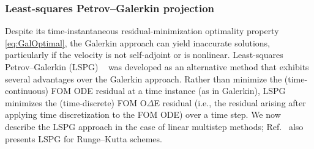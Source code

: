 \documentclass[3p,computermodern,10pt]{elsarticle}
\begin{document}
\subsubsection{Least-squares Petrov--Galerkin projection}
Despite its time-instantaneous residual-minimization optimality property 
\eqref{eq:GalOptimal}, the Galerkin approach can yield inaccurate solutions,
particularly if the velocity is not self-adjoint or
is nonlinear. 
Least-squares Petrov--Galerkin (LSPG)
~\cite{carlberg_lspg_v_galerkin,carlberg_thesis,carlberg_gnat,bui_unsteady,bui_thesis}
was developed
as an alternative method that exhibits several advantages over the Galerkin approach.
Rather than minimize the (time-continuous) FOM ODE residual at a time instance (as in Galerkin), LSPG minimizes
the (time-discrete) FOM O$\Delta$E residual 
(i.e., the residual arising after applying time discretization to the FOM ODE)
over a time step.
We now describe the LSPG approach in the case of linear multistep methods;
Ref.~\cite{carlberg_lspg_v_galerkin} also presents LSPG for Runge--Kutta
schemes. 
\end{document}
